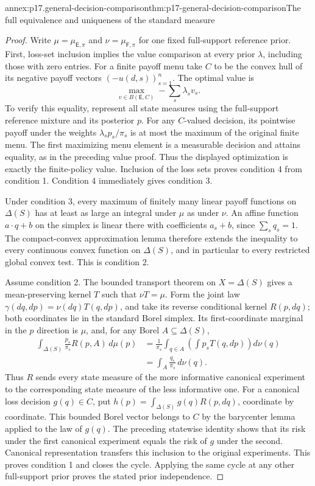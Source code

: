 \begin{annexitem}{annex:p17.general-decision-comparison}{thm:p17-general-decision-comparison}{The full equivalence and uniqueness of the standard measure}
\begin{proof}
Write \(\mu=\mu_{\mathsf E,\pi}\) and \(\nu=\mu_{\mathsf F,\pi}\)
for one fixed full-support reference prior.
First, loss-set inclusion implies the value comparison at every
prior \(\lambda\), including those with zero entries.
For a finite payoff menu take \(C\) to be the convex hull of its
negative payoff vectors \((-u(d,s))_{s=1}^n\).
The optimal value is
\[
                         \max_{v\in B(\mathsf E,C)}-\sum_s\lambda_sv_s.
\]
To verify this equality, represent all state measures using the
full-support reference mixture and its posterior \(p\).
For any \(C\)-valued decision, its pointwise payoff under the weights
\(\lambda_sp_s/\pi_s\) is at most the maximum of the original finite
menu. The first maximizing menu element is a measurable decision and
attains equality, as in the preceding value proof.
Thus the displayed optimization is exactly the finite-policy value.
Inclusion of the loss sets proves condition 4 from condition 1.
Condition 4 immediately gives condition 3.

Under condition 3, every maximum of finitely many linear payoff
functions on \(\Delta(S)\) has at least as large an integral under
\(\mu\) as under \(\nu\).
An affine function \(a\cdot q+b\) on the simplex is linear there
with coefficients \(a_s+b\), since \(\sum_sq_s=1\).
The compact-convex approximation lemma therefore extends the inequality
to every continuous convex function on \(\Delta(S)\), and in particular
to every restricted global convex test. This is condition 2.

Assume condition 2. The bounded transport theorem on
\(X=\Delta(S)\) gives a mean-preserving kernel \(T\) such that
\(\nu T=\mu\). Form the joint law
\(\gamma(dq,dp)=\nu(dq)T(q,dp)\), and take its reverse conditional
kernel \(R(p,dq)\); both coordinates lie in the standard Borel simplex.
Its first-coordinate marginal in the \(p\) direction is \(\mu\),
and, for any Borel \(A\subseteq\Delta(S)\),
\[
 \begin{aligned}
 \int_{\Delta(S)}\frac{p_s}{\pi_s}R(p,A)\,d\mu(p)
   &=\frac1{\pi_s}\int_{q\in A}\left(\int p_sT(q,dp)\right)d\nu(q)\\
   &=\int_A\frac{q_s}{\pi_s}\,d\nu(q).
 \end{aligned}
\]
Thus \(R\) sends every state measure of the more informative
canonical experiment to the corresponding state measure of the less
informative one. For a canonical loss decision \(g(q)\in C\), put
\(h(p)=\int_{\Delta(S)}g(q)R(p,dq)\), coordinate by coordinate.
This bounded Borel vector belongs to \(C\) by
the barycenter lemma applied to the law of \(g(q)\).
The preceding statewise identity shows that its risk under the
first canonical experiment equals the risk of \(g\) under the second.
Canonical representation transfers this inclusion to the original
experiments. This proves condition 1 and closes the cycle.
Applying the same cycle at any other full-support prior proves the
stated prior independence.


\end{proof}
\end{annexitem}
